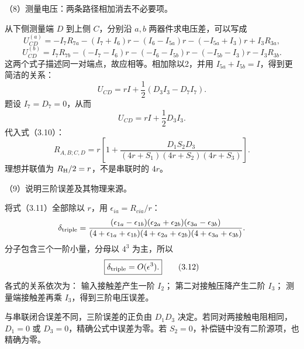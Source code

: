 \documentclass[12pt,a4paper,fontset=fandol]{ctexart}
\begin{document}
（8）测量电压：两条路径相加消去不必要项。

从下侧测量端 \(D\) 到上侧 \(C\)，分别沿 \(a,b\) 两器件求电压差，可以写成
\[
U_{CD}^{(a)}
=-I_7R_{7a}-(I_7+I_6)r
-(I_6-I_{5a})r-(-I_{5a}+I_3)r+I_3R_{3a},
\] \[
U_{CD}^{(b)}
=I_7R_{7b}-(-I_7-I_6)r
-(-I_6-I_{5b})r-(-I_{5b}-I_3)r-I_3R_{3b}.
\] 这两个式子描述同一对端点，故应相等。相加除以2，并用
\(I_{5a}+I_{5b}=I\)，得到更简洁的关系： \[
U_{CD}=rI+\frac12(D_3I_3-D_7I_7).
\] 题设 \(I_7=D_7=0\)，从而 \[
U_{CD}=rI+\frac12D_3I_3.
\] 代入式（3.10）： \[
\boxed{
R_{A,B;C,D}
=r\left[
1+\frac{D_1S_2D_3}
{(4r+S_1)(4r+S_2)(4r+S_3)}
\right].}\tag{3.11}
\] 理想并联值为 \(R_{\rm H}/2=r\)，不是串联时的 \(4r\)。

（9）说明三阶误差及其物理来源。

将式（3.11）全部除以 \(r\)，用 \(\epsilon_{ia}=R_{cia}/r\)： \[
\delta_{\rm triple}=
\frac{(\epsilon_{1a}-\epsilon_{1b})
(\epsilon_{2a}+\epsilon_{2b})
(\epsilon_{3a}-\epsilon_{3b})}
{(4+\epsilon_{1a}+\epsilon_{1b})
(4+\epsilon_{2a}+\epsilon_{2b})
(4+\epsilon_{3a}+\epsilon_{3b})}.
\] 分子包含三个一阶小量，分母以 \(4^3\) 为主，所以 \[
\boxed{\delta_{\rm triple}=O(\epsilon^3).}\tag{3.12}
\] 各式的关系依次为： 输入接触差产生一阶 \(I_2\)；
第二对接触压降产生二阶 \(I_3\)； 测量端接触差再乘
\(I_3\)，得到三阶电压误差。

\begin{center}
\begin{minipage}{\linewidth}
\centering\begingroup
{}
\ifdim\wd\diagrambox>.88\linewidth
\sbox{\diagrambox}{\resizebox{.88\linewidth}{!}{\usebox{\diagrambox}}}
\fi
\ifdim\ht\diagrambox>.40\textheight
\resizebox{!}{.40\textheight}{\usebox{\diagrambox}}
\else\usebox{\diagrambox}\fi
\par{}
\endgroup\end{minipage}
\end{center}

与串联闭合误差不同，三阶误差的正负由 \(D_1D_3\)
决定。若同对两接触电阻相同，\(D_1=0\) 或
\(D_3=0\)，精确公式中误差为零。若
\(S_2=0\)，补偿链中没有二阶源项，也精确为零。
\end{document}
